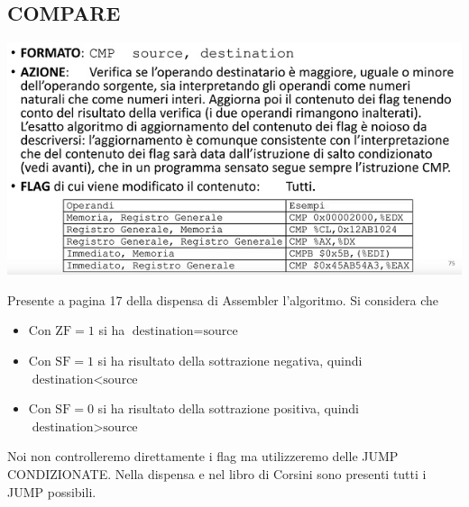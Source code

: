 \documentclass[11pt]{report}
\begin{document}
\subsection{COMPARE}
\begin{center}
\includegraphics{img/18.PNG}
\end{center}
Presente a pagina 17 della dispensa di Assembler l'algoritmo. Si considera che
\begin{itemize}
\item Con $\text{ZF} = 1$ si ha $\text{destination} = \text{source}$
\item Con $\text{SF} = 1$ si ha risultato della sottrazione negativa, quindi $\text{destination} < \text{source}$
\item Con $\text{SF} = 0$ si ha risultato della sottrazione positiva, quindi $\text{destination} > \text{source}$
\end{itemize}
Noi non controlleremo direttamente i flag ma utilizzeremo delle JUMP CONDIZIONATE. Nella dispensa e nel libro di Corsini sono presenti tutti i JUMP possibili.
\end{document}
